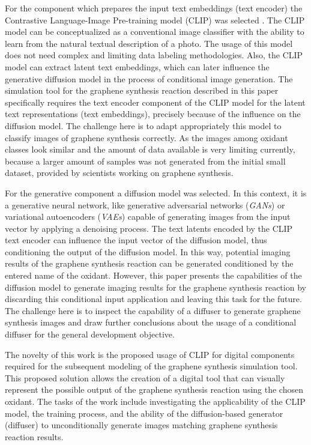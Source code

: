 \documentclass[runningheads]{llncs}
\begin{document}
For the component which prepares the input text embeddings (text encoder) the Contrastive Language-Image Pre-training model (CLIP) was selected \cite{CLIP}. The CLIP model can be conceptualized as a conventional image classifier with the ability to learn from the natural textual description of a photo. The usage of this model does not need complex and limiting data labeling methodologies. Also, the CLIP model can extract latent text embeddings, which can later influence the generative diffusion model in the process of conditional image generation. The simulation tool for the graphene synthesis reaction described in this paper specifically requires the text encoder component of the CLIP model for the latent text representations (text embeddings), precisely because of the influence on the diffusion model. The challenge here is to adapt appropriately this model to classify images of graphene synthesis correctly. As the images among oxidant classes look similar and the amount of data available is very limiting currently, because a larger amount of samples was not generated from the initial small dataset, provided by scientists working on graphene synthesis.
\par
For the generative component a diffusion model \cite{Diffusion,Diffusion_Ho} was selected. In this context, it is a generative neural network, like generative adversarial networks (\textit{GANs}) \cite{GAN} or variational autoencoders (\textit{VAEs}) \cite{VAE} capable of generating images from the input vector by applying a denoising process. The text latents encoded by the CLIP text encoder can influence the input vector of the diffusion model, thus conditioning the output of the diffusion model. In this way, potential imaging results of the graphene synthesis reaction can be generated conditioned by the entered name of the oxidant. However, this paper presents the capabilities of the diffusion model to generate imaging results for the graphene synthesis reaction by discarding this conditional input application and leaving this task for the future. The challenge here is to inspect the capability of a diffuser to generate graphene synthesis images and draw further conclusions about the usage of a conditional diffuser for the general development objective.
\par
The novelty of this work is the proposed usage of CLIP for digital components required for the subsequent modeling of the graphene synthesis simulation tool. This proposed solution allows the creation of a digital tool that can visually represent the possible output of the graphene synthesis reaction using the chosen oxidant. The tasks of the work include investigating the applicability of the CLIP model, the training process, and the ability of the diffusion-based generator (diffuser) to unconditionally generate images matching graphene synthesis reaction results.
\end{document}
